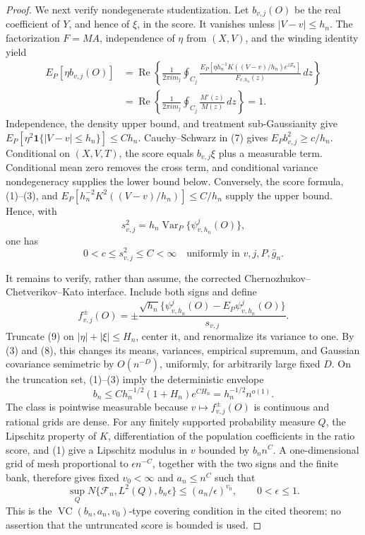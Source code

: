 \documentclass{article}
\begin{document}
\begin{proof}
We next verify nondegenerate studentization.  Let \(b_{v,j}(O)\) be the real coefficient of \(Y\), and hence of \(\xi\), in the score.  It vanishes unless \(|V-v|\le h_n\).  The factorization \(F=MA\), independence of \(\eta\) from \((X,V)\), and the winding identity yield
\[
 \begin{aligned}
 E_P[\eta b_{v,j}(O)]
 &=\operatorname{Re}\left\{\frac1{2\pi i m_j}\oint_{C_j}
 \frac{E_P[\eta h_n^{-1}K((V-v)/h_n)e^{zZ_n}]}{F_{v,h_n}(z)}\,dz\right\}\\
 &=\operatorname{Re}\left\{\frac1{2\pi i m_j}\oint_{C_j}\frac{M'(z)}{M(z)}\,dz\right\}=1. 
 \end{aligned} \tag{7}
\]
Independence, the density upper bound, and treatment sub-Gaussianity give
\(E_P[\eta^2\mathbf 1\{|V-v|\le h_n\}]\le Ch_n\).  Cauchy--Schwarz in (7) gives \(E_Pb_{v,j}^2\ge c/h_n\).  Conditional on \((X,V,T)\), the score equals \(b_{v,j}\xi\) plus a measurable term.  Conditional mean zero removes the cross term, and conditional variance nondegeneracy supplies the lower bound below.  Conversely, the score formula, (1)--(3), and
\(E_P[h_n^{-2}K^2((V-v)/h_n)]\le C/h_n\) supply the upper bound.  Hence, with
\[
 s_{v,j}^2=h_n\operatorname{Var}_P\{\psi^j_{v,h_n}(O)\},
\]
one has
\[
 0<c\le s_{v,j}^2\le C<\infty
 \quad\text{uniformly in }v,j,P,\bar g_n. \tag{8}
\]

It remains to verify, rather than assume, the corrected Chernozhukov--Chetverikov--Kato interface.  Include both signs and define
\[
 f_{v,j}^{\pm}(O)=\pm
 \frac{\sqrt{h_n}\{\psi^j_{v,h_n}(O)-E_P\psi^j_{v,h_n}(O)\}}{s_{v,j}}. \tag{9}
\]
Truncate (9) on \(|\eta|+|\xi|\le H_n\), center it, and renormalize its variance to one.  By (3) and (8), this changes its means, variances, empirical supremum, and Gaussian covariance semimetric by \(O(n^{-D})\), uniformly, for arbitrarily large fixed \(D\).  On the truncation set, (1)--(3) imply the deterministic envelope
\[
 b_n\le Ch_n^{-1/2}(1+H_n)e^{CH_n}
 =h_n^{-1/2}n^{o(1)}. \tag{10}
\]
The class is pointwise measurable because \(v\mapsto f_{v,j}^{\pm}(O)\) is continuous and rational grids are dense.  For any finitely supported probability measure \(Q\), the Lipschitz property of \(K\), differentiation of the population coefficients in the ratio score, and (1) give a Lipschitz modulus in \(v\) bounded by \(b_nn^C\).  A one-dimensional grid of mesh proportional to \(\epsilon n^{-C}\), together with the two signs and the finite bank, therefore gives fixed \(v_0<\infty\) and \(a_n\le n^C\) such that
\[
 \sup_QN\{\mathcal F_n,L^2(Q),b_n\epsilon\}
 \le(a_n/\epsilon)^{v_0},
 \qquad 0<\epsilon\le1. \tag{11}
\]
This is the \(\operatorname{VC}(b_n,a_n,v_0)\)-type covering condition in the cited theorem; no assertion that the untruncated score is bounded is used.


\end{proof}
\end{document}
